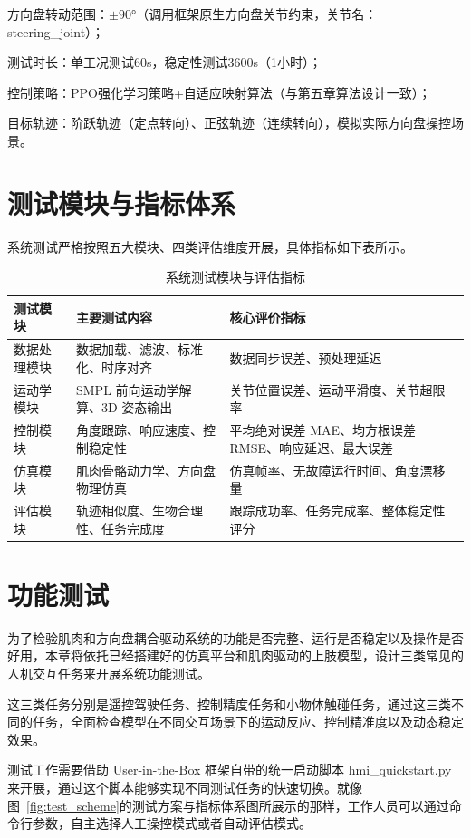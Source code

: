 方向盘转动范围：$±90°$（调用框架原生方向盘关节约束，关节名：steering\_joint）；

测试时长：单工况测试60s，稳定性测试3600s（1小时）；

控制策略：PPO强化学习策略+自适应映射算法（与第五章算法设计一致）；

目标轨迹：阶跃轨迹（定点转向）、正弦轨迹（连续转向），模拟实际方向盘操控场景。
\section{测试模块与指标体系}
系统测试严格按照五大模块、四类评估维度开展，具体指标如下表所示。
\begin{table}[htbp]
  \centering
  \caption{系统测试模块与评估指标}
  \label{tab:test_index}
  \begin{tabular}{p{2.5cm}p{5cm}p{7cm}}
    \toprule
    测试模块 & 主要测试内容 & 核心评价指标 \\
    \midrule
    数据处理模块 & 数据加载、滤波、标准化、时序对齐 & 数据同步误差、预处理延迟 \\
    运动学模块 & SMPL 前向运动学解算、3D 姿态输出 & 关节位置误差、运动平滑度、关节超限率 \\
    控制模块 & 角度跟踪、响应速度、控制稳定性 & 平均绝对误差 MAE、均方根误差 RMSE、响应延迟、最大误差 \\
    仿真模块 & 肌肉骨骼动力学、方向盘物理仿真 & 仿真帧率、无故障运行时间、角度漂移量 \\
    评估模块 & 轨迹相似度、生物合理性、任务完成度 & 跟踪成功率、任务完成率、整体稳定性评分 \\
    \bottomrule
  \end{tabular}
\end{table}

\section{功能测试}
为了检验肌肉和方向盘耦合驱动系统的功能是否完整、运行是否稳定以及操作是否好用，本章将依托已经搭建好的仿真平台和肌肉驱动的上肢模型，设计三类常见的人机交互任务来开展系统功能测试。

这三类任务分别是遥控驾驶任务、控制精度任务和小物体触碰任务，通过这三类不同的任务，全面检查模型在不同交互场景下的运动反应、控制精准度以及动态稳定效果。

测试工作需要借助 User-in-the-Box 框架自带的统一启动脚本 hmi\_quickstart.py 来开展，通过这个脚本能够实现不同测试任务的快速切换。就像图~\ref{fig:test_scheme}的测试方案与指标体系图所展示的那样，工作人员可以通过命令行参数，自主选择人工操控模式或者自动评估模式。

